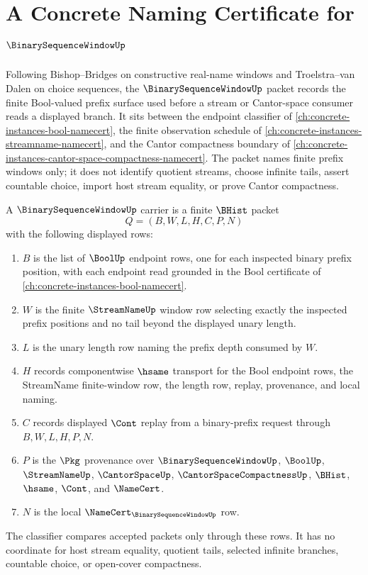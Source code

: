 \chapter{A Concrete Naming Certificate for $\BinarySequenceWindowUp$}
\label{ch:concrete-instances-binary-sequence-window-namecert}

Following Bishop--Bridges on constructive real-name windows and Troelstra--van Dalen on choice sequences, the $\BinarySequenceWindowUp$ packet records the finite Bool-valued prefix surface used before a stream or Cantor-space consumer reads a displayed branch. It sits between the endpoint classifier of \autoref{ch:concrete-instances-bool-namecert}, the finite observation schedule of \autoref{ch:concrete-instances-streamname-namecert}, and the Cantor compactness boundary of \autoref{ch:concrete-instances-cantor-space-compactness-namecert}. The packet names finite prefix windows only; it does not identify quotient streams, choose infinite tails, assert countable choice, import host stream equality, or prove Cantor compactness.

\begin{definition}
\label{def:binary-sequence-window-carrier}
A $\BinarySequenceWindowUp$ carrier is a finite $\BHist$ packet
$$
Q=(B,W,L,H,C,P,N)
$$
with the following displayed rows:
\begin{enumerate}
\item $B$ is the list of $\BoolUp$ endpoint rows, one for each inspected binary prefix position, with each endpoint read grounded in the Bool certificate of \autoref{ch:concrete-instances-bool-namecert}.
\item $W$ is the finite $\StreamNameUp$ window row selecting exactly the inspected prefix positions and no tail beyond the displayed unary length.
\item $L$ is the unary length row naming the prefix depth consumed by $W$.
\item $H$ records componentwise $\hsame$ transport for the Bool endpoint rows, the StreamName finite-window row, the length row, replay, provenance, and local naming.
\item $C$ records displayed $\Cont$ replay from a binary-prefix request through $B,W,L,H,P,N$.
\item $P$ is the $\Pkg$ provenance over $\BinarySequenceWindowUp$, $\BoolUp$, $\StreamNameUp$, $\CantorSpaceUp$, $\CantorSpaceCompactnessUp$, $\BHist$, $\hsame$, $\Cont$, and $\NameCert$.
\item $N$ is the local $\NameCert_{\BinarySequenceWindowUp}$ row.
\end{enumerate}
The classifier compares accepted packets only through these rows. It has no coordinate for host stream equality, quotient tails, selected infinite branches, countable choice, or open-cover compactness.
\end{definition}

